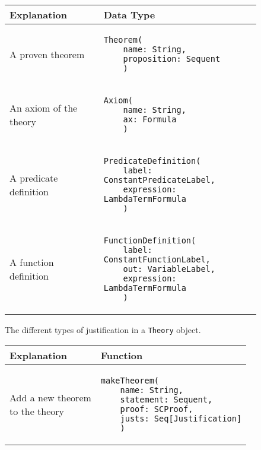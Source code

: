 {
\def\arraystretch{4}
\begin{figure}[hp]
\begin{center}
\begin{tabular}{l|l}
Explanation & Data Type
\\ \hline

A proven theorem & 
\begin{lstlisting}
Theorem(
	name: String,
	proposition: Sequent
	)

\end{lstlisting}
\\ %

An axiom of the theory & 
\begin{lstlisting}
Axiom(
	name: String,
	ax: Formula
	)

\end{lstlisting}
\\ %

A predicate definition & 
\begin{lstlisting}
PredicateDefinition(
	label: ConstantPredicateLabel,
	expression: LambdaTermFormula
	)

\end{lstlisting} 
\\ %

A function definition & 
\begin{lstlisting}
FunctionDefinition(
	label: ConstantFunctionLabel,
	out: VariableLabel,
	expression: LambdaTermFormula
	)

\end{lstlisting}
\\ %

\end{tabular}
\caption{The different types of justification in a \lstinline{Theory}{} object.}
\label{fig:justifications}
\end{center}
\end{figure}

\begin{figure}[hp]
\begin{center}
\begin{tabular}{l|l}
Explanation & Function
\\ \hline

\makecell[l]{Add a new theorem\\to the theory} & 
\begin{lstlisting}
makeTheorem(
	name: String,
	statement: Sequent,
	proof: SCProof,
	justs: Seq[Justification]
	)
\end{lstlisting}
\\ %


\end{tabular}
\end{center}
\end{figure}}
